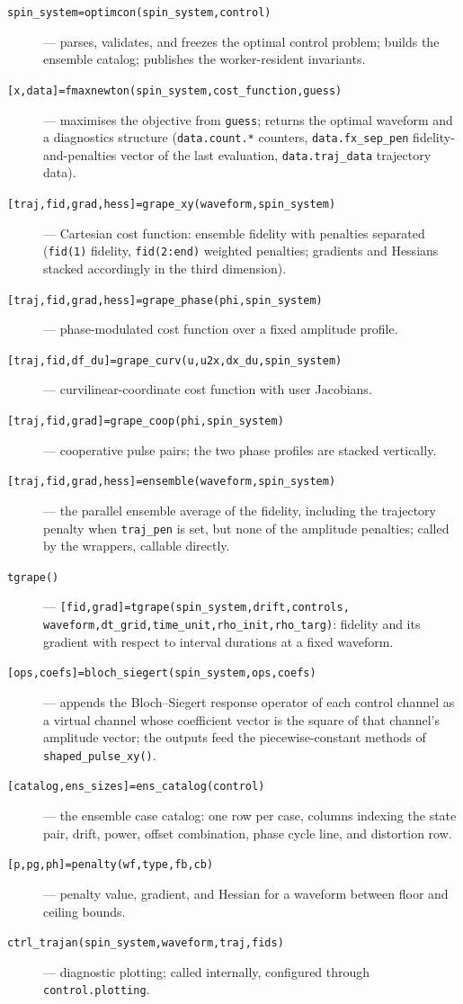 \documentclass[11pt,a4paper]{article}
\newcommand{\code}[1]{\texttt{#1}}
\begin{document}
\begin{description}
\item[\code{spin\_system=optimcon(spin\_system,control)}] --- parses,
  validates, and freezes the optimal control problem; builds the
  ensemble catalog; publishes the worker-resident invariants.
\item[\code{[x,data]=fmaxnewton(spin\_system,cost\_function,guess)}]
  --- maximises the objective from \code{guess}; returns the optimal
  waveform and a diagnostics structure (\code{data.count.*} counters,
  \code{data.fx\_sep\_pen} fidelity-and-penalties vector of the last
  evaluation, \code{data.traj\_data} trajectory data).
\item[\code{[traj,fid,grad,hess]=grape\_xy(waveform,spin\_system)}] ---
  Cartesian cost function: ensemble fidelity with penalties separated
  (\code{fid(1)} fidelity, \code{fid(2:end)} weighted penalties;
  gradients and Hessians stacked accordingly in the third dimension).
\item[\code{[traj,fid,grad,hess]=grape\_phase(phi,spin\_system)}] ---
  phase-modulated cost function over a fixed amplitude profile.
\item[\code{[traj,fid,df\_du]=grape\_curv(u,u2x,dx\_du,spin\_system)}]
  --- curvilinear-coordinate cost function with user Jacobians.
\item[\code{[traj,fid,grad]=grape\_coop(phi,spin\_system)}] ---
  cooperative pulse pairs; the two phase profiles are stacked
  vertically.
\item[\code{[traj,fid,grad,hess]=ensemble(waveform,spin\_system)}] ---
  the parallel ensemble average of the fidelity, including the
  trajectory penalty when \code{traj\_pen} is set, but none of the
  amplitude penalties; called by the wrappers, callable directly.
\item[\code{tgrape()}] ---
  \code{[fid,grad]=tgrape(spin\_system,drift,controls,}
  \code{waveform,dt\_grid,time\_unit,rho\_init,rho\_targ)}:
  fidelity and its gradient with respect to interval durations at a
  fixed waveform.
\item[\code{[ops,coefs]=bloch\_siegert(spin\_system,ops,coefs)}] ---
  appends the Bloch--Siegert response operator of each control channel
  as a virtual channel whose coefficient vector is the square of that
  channel's amplitude vector; the outputs feed the piecewise-constant
  methods of \code{shaped\_pulse\_xy()}.
\item[\code{[catalog,ens\_sizes]=ens\_catalog(control)}] --- the
  ensemble case catalog: one row per case, columns indexing the state
  pair, drift, power, offset combination, phase cycle line, and
  distortion row.
\item[\code{[p,pg,ph]=penalty(wf,type,fb,cb)}] --- penalty value,
  gradient, and Hessian for a waveform between floor and ceiling
  bounds.
\item[\code{ctrl\_trajan(spin\_system,waveform,traj,fids)}] ---
  diagnostic plotting; called internally, configured through
  \code{control.plotting}.
\end{description}
\end{document}

